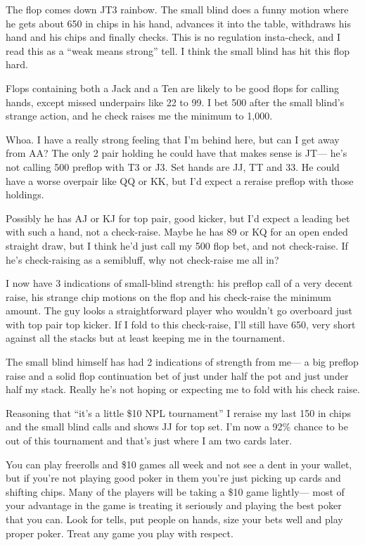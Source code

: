 The flop comes down JT3 rainbow. The small blind does a funny motion 
where he gets about 650 in chips in his hand, advances it into the 
table, withdraws his hand and his chips and finally checks. This is 
no regulation insta-check, and I read this as a ``weak means strong'' 
tell. I think the small blind has hit this flop hard.

Flops containing both a Jack and a Ten are likely to be good flops 
for calling hands, except missed underpairs like 22 to 99. I bet 
500 after the small blind's strange action, and he check raises me 
the minimum to 1,000.

Whoa. I have a really strong feeling that I'm behind here, but can 
I get away from AA? The only 2 pair holding he could have that makes 
sense is JT--- he's not calling 500 preflop with T3 or J3. Set hands 
are JJ, TT and 33. He could have a worse overpair like QQ or KK, 
but I'd expect a reraise preflop with those holdings. 

Possibly he has AJ or KJ for top pair, good kicker, but I'd 
expect a leading bet with such a hand, not a check-raise. Maybe he 
has 89 or KQ for an open ended straight draw, but I think he'd just 
call my 500 flop bet, and not check-raise. If he's check-raising 
as a semibluff, why not check-raise me all in?

I now have 3 indications of small-blind strength: his preflop call 
of a very decent raise, his strange chip motions on the flop and his 
check-raise the minimum amount. The guy looks a straightforward player 
who wouldn't go overboard just with top pair top kicker. If I fold 
to this check-raise, I'll still have 650, very short
against all the stacks but at least keeping me in the tournament.

The small blind himself has had 2 indications of strength from 
me--- a big preflop raise and a solid flop continuation bet of just 
under half the pot and just under half my stack. Really he's not hoping 
or expecting me to fold with his check raise.

Reasoning that ``it's a little \$10 NPL tournament'' I reraise my 
last 150 in chips and the small blind calls and shows JJ for top set. 
I'm now a 92\% chance to be out of this tournament and that's just where 
I am two cards later.

You can play freerolls and \$10 games all week and not see a dent 
in your wallet, but if you're not playing good poker in them you're 
just picking up cards and shifting chips. Many of the players will 
be taking a \$10 game lightly--- most of your advantage in the game 
is treating it seriously and playing the best poker that you can. 
Look for tells, put people on hands, size your bets well and 
play proper poker. Treat any game you play with respect.

